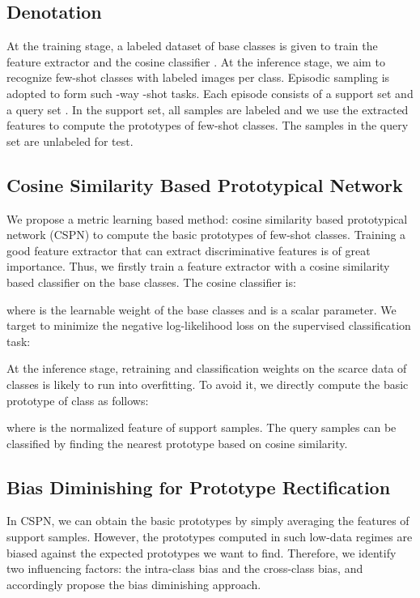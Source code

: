 \documentclass[runningheads]{llncs}
\begin{document}
\subsection{Denotation}  
At the training stage, a labeled dataset  of base classes  is given to train the feature extractor  and the cosine classifier .
At the inference stage, we aim to recognize few-shot classes  with  labeled images per class. Episodic sampling is adopted to form such -way -shot tasks. Each episode consists of a support set  and a query set . In the support set, all samples  are labeled and we use the extracted features  to compute the prototypes  of few-shot classes. The samples in the query set are unlabeled for test.





\subsection{Cosine Similarity Based Prototypical Network}
\label{section-CSPN}
We propose a metric learning based method: cosine similarity based prototypical network (CSPN) to compute the basic prototypes of few-shot classes. Training a good feature extractor that can extract discriminative features is of great importance. Thus, we firstly train a feature extractor  with a cosine similarity based classifier  on the base classes. The cosine classifier  is:

where  is the learnable weight of the base classes and  is a scalar parameter. We target to minimize the negative log-likelihood loss on the supervised classification task:

At the inference stage, retraining  and classification weights on the scarce data of  classes is likely to run into overfitting. To avoid it, we directly compute the basic prototype  of class  as follows:

where  is the normalized feature of support samples. The query samples can be classified by finding the nearest prototype based on cosine similarity.



\subsection{Bias Diminishing for Prototype Rectification}
\label{subsec:bias-diminishing}
In CSPN, we can obtain the basic prototypes by simply averaging the features of support samples. However, the prototypes computed in such low-data regimes are biased against the expected prototypes we want to find. 
Therefore, we identify two influencing factors: the intra-class bias and the cross-class bias, and accordingly propose the bias diminishing approach.
\end{document}
